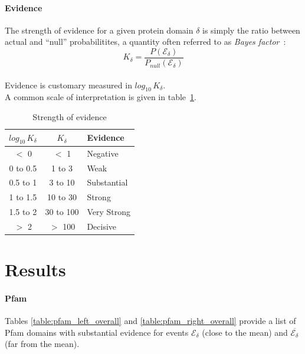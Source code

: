 \documentclass[12pt]{article}
\begin{document}
\paragraph{Evidence}
The strength of evidence for a given protein domain $\delta$ is simply the ratio between actual and ``null'' probabilitites, a quantity often referred to as \textit{Bayes factor}~\cite{kass1995bayes}:
%
\begin{equation}
K_{\delta} = \frac{P(\mathscr{E_{\delta}})}{P_{null}(\mathscr{E_{\delta}})}
\end{equation}
%
\\
Evidence is customary measured in $log_{10}\,K_{\delta}$.\\ 
A common scale of interpretation is given in table~\ref{table:evidence}.

\pagebreak

\begin{table}
	\centering
    \begin{tabular}{c c l}
        \toprule
        $log_{10}\,K_{\delta}$ & $K_{\delta}$ & Evidence \\
        \midrule
        $<$ 0 & $<$ 1 & Negative \\
        0 to 0.5 & 1 to 3 & Weak \\
        0.5 to 1 & 3 to 10 & Substantial \\
        1 to 1.5 & 10 to 30 & Strong \\
        1.5 to 2 & 30 to 100 & Very Strong \\
        $>$ 2 & $>$ 100 & Decisive \\
        \bottomrule
    \end{tabular}
    \caption{Strength of evidence}
    \label{table:evidence}
\end{table}

\section{Results}

\paragraph{Pfam}
Tables \ref{table:pfam_left_overall} and \ref{table:pfam_right_overall} provide a list of Pfam domains with substantial evidence for events $\mathscr{E_{\delta}}$ (close to the mean) and $\overline{\mathscr{E_{\delta}}}$ (far from the mean).
\end{document}

